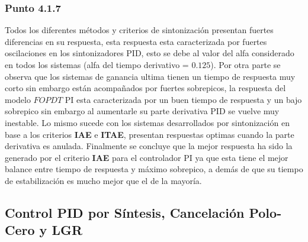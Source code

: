 \documentclass[twocolumn]{IEEEtran}
\begin{document}
\subsubsection{Punto 4.1.7}
\noindent
Todos los diferentes métodos y criterios de sintonización presentan fuertes diferencias en su respuesta, esta respuesta esta caracterizada por fuertes oscilaciones  en los sintonizadores PID, esto se debe  al valor del alfa  considerado en todos los sistemas (alfa del tiempo derivativo = $0.125$). Por otra parte se observa que los sistemas de ganancia ultima tienen un tiempo de respuesta muy corto sin embargo están acompañados por fuertes sobrepicos, la respuesta del modelo $FOPDT$  PI esta caracterizada por un buen tiempo de respuesta y un bajo sobrepico sin embargo al aumentarle su parte derivativa PID se vuelve muy inestable. Lo mismo sucede con los sistemas desarrollados por sintonización en base a los criterios \textbf{IAE} e \textbf{ITAE},  presentan respuestas optimas cuando la parte derivativa es anulada. Finalmente se concluye que la mejor respuesta ha sido la generado por el criterio \textbf{IAE} para el controlador PI ya que esta tiene el mejor balance entre tiempo de respuesta y máximo sobrepico, a demás de que su tiempo de estabilización es mucho mejor que el de la mayoría.

\subsection{Control PID por Síntesis, Cancelación Polo-Cero y LGR}
\noindent
\end{document}
